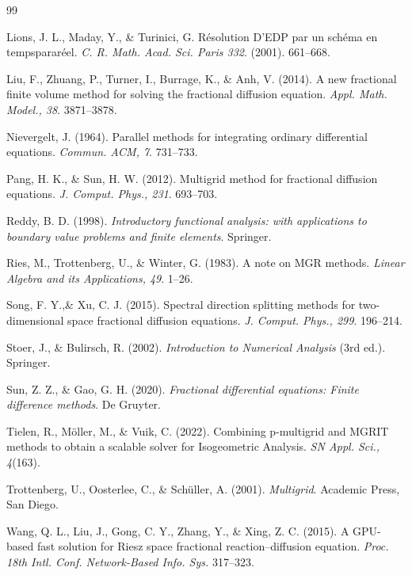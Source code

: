 \begin{thebibliography}{99}
\begin{LTRbibitems}
Lions, J. L., Maday, Y., \& Turinici, G.
Résolution D’EDP par un schéma en tempspararéel.
\textit{C. R. Math. Acad. Sci. Paris 332}.
(2001).
661–668.

Liu, F., Zhuang, P., Turner, I., Burrage, K., \& Anh, V.
(2014).
A new fractional finite volume method for solving the fractional diffusion equation.
\textit{Appl. Math. Model., 38}.
3871–3878.

Nievergelt, J.
(1964).
Parallel methods for integrating ordinary differential equations.
\textit{Commun. ACM, 7}.
731–733.

Pang, H. K., \& Sun, H. W.
(2012).
Multigrid method for fractional diffusion equations.
\textit{J. Comput. Phys., 231}.
693–703.

Reddy, B. D.
(1998).
\textit{Introductory functional analysis: with applications to boundary value problems and finite elements}.
Springer.

Ries, M., Trottenberg, U., \& Winter, G.
(1983).
A note on MGR methods.
\textit{Linear Algebra and its Applications, 49}.
1–26.

Song, F. Y.,\& Xu, C. J.
(2015).
Spectral direction splitting methods for two-dimensional space fractional diffusion equations.
\textit{J. Comput. Phys., 299}.
196–214.

Stoer, J., \& Bulirsch, R.
(2002).
\textit{Introduction to Numerical Analysis} (3rd ed.).
Springer.

Sun, Z. Z., \& Gao, G. H.
(2020).
\textit{Fractional differential equations: Finite difference methods}.
De Gruyter.

Tielen, R., Möller, M., \& Vuik, C.
(2022).
Combining p-multigrid and MGRIT methods to obtain a scalable solver for Isogeometric Analysis.
\textit{SN Appl. Sci., 4}(163).

Trottenberg, U., Oosterlee, C., \& Schüller, A.
(2001).
\textit{Multigrid}. 
Academic Press, San Diego.

Wang, Q. L., Liu, J., Gong, C. Y., Zhang, Y., \& Xing, Z. C.
(2015).
A GPU-based fast solution for Riesz space fractional reaction–diffusion equation.
\textit{Proc. 18th Intl. Conf. Network-Based Info. Sys.}
317–323.


\end{LTRbibitems}
\end{thebibliography}
